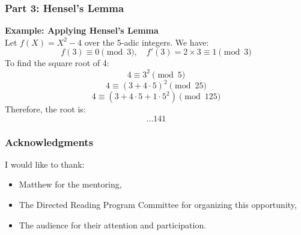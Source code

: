 \documentclass{beamer}
\begin{document}
\begin{frame}
    \frametitle{Part 3: Hensel's Lemma}
    	\textbf{Example: Applying Hensel's Lemma} \\
    Let \( f(X) = X^2 - 4 \) over the 5-adic integers. We have:
    \[ f(3) \equiv 0 \pmod{3}, \quad f'(3) = 2 \times 3 \equiv 1 \pmod{3} \]
    To find the square root of 4:
    \[ 4 \equiv 3^2 \pmod{5} \]
    \[ 4 \equiv (3 + 4 \cdot 5)^2 \pmod{25} \]
    \[ 4 \equiv (3 + 4 \cdot 5 + 1 \cdot 5^2) \pmod{125} \]
    Therefore, the root is:
    \[ \ldots 141
    \]
\end{frame}

\begin{frame}
    \frametitle{Acknowledgments}
    I would like to thank:
    
    \begin{itemize}
        \item Matthew for the mentoring,
        \item The Directed Reading Program Committee for organizing this opportunity,
        \item The audience for their attention and participation.
    \end{itemize}
\end{frame}
\end{document}
